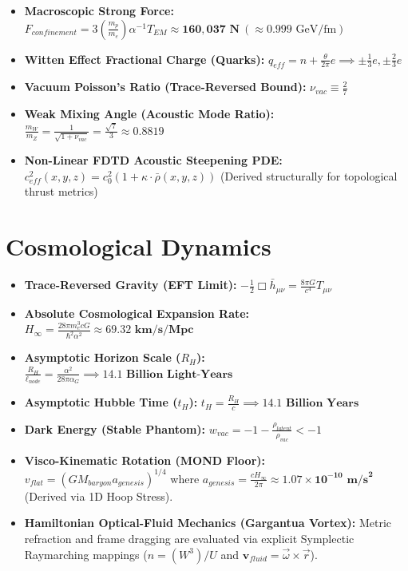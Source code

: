 \begin{itemize}
    \item \textbf{Macroscopic Strong Force:} $F_{confinement} = 3 \left(\frac{m_p}{m_e}\right) \alpha^{-1} T_{EM} \approx \mathbf{160{,}037\text{ N}} \ (\approx 0.999\text{ GeV/fm})$
    \item \textbf{Witten Effect Fractional Charge (Quarks):} $q_{eff} = n + \frac{\theta}{2\pi}e \implies \pm \frac{1}{3}e, \pm \frac{2}{3}e$
    \item \textbf{Vacuum Poisson's Ratio (Trace-Reversed Bound):} $\nu_{vac} \equiv \frac{2}{7}$
    \item \textbf{Weak Mixing Angle (Acoustic Mode Ratio):} $\frac{m_W}{m_Z} = \frac{1}{\sqrt{1+\nu_{vac}}} = \frac{\sqrt{7}}{3} \approx \mathbf{0.8819}$
    \item \textbf{Non-Linear FDTD Acoustic Steepening PDE:} $c_{eff}^2(x, y, z) = c_0^2 \left(1 + \kappa \cdot \bar{\rho}(x, y, z) \right)$ (Derived structurally for topological thrust metrics)
\end{itemize}

\section{Cosmological Dynamics}
\begin{itemize}
    \item \textbf{Trace-Reversed Gravity (EFT Limit):} $-\frac{1}{2} \Box \bar{h}_{\mu\nu} = \frac{8\pi G}{c^4} T_{\mu\nu}$
    \item \textbf{Absolute Cosmological Expansion Rate:} $H_\infty = \frac{28\pi m_e^3 c G}{\hbar^2 \alpha^2} \approx \mathbf{69.32 \text{ km/s/Mpc}}$
    \item \textbf{Asymptotic Horizon Scale ($R_H$):} $\frac{R_H}{\ell_{node}} = \frac{\alpha^2}{28\pi\alpha_G} \implies \mathbf{14.1 \text{ Billion Light-Years}}$
    \item \textbf{Asymptotic Hubble Time ($t_H$):} $t_H = \frac{R_H}{c} \implies \mathbf{14.1 \text{ Billion Years}}$
    \item \textbf{Dark Energy (Stable Phantom):} $w_{vac} = -1 - \frac{\rho_{latent}}{\rho_{vac}} < -1$
    \item \textbf{Visco-Kinematic Rotation (MOND Floor):} $v_{flat} = (GM_{baryon} a_{genesis})^{1/4}$ where $a_{genesis} = \frac{c H_\infty}{2\pi} \approx \mathbf{1.07 \times 10^{-10} \text{ m/s}^2}$ (Derived via 1D Hoop Stress).
    \item \textbf{Hamiltonian Optical-Fluid Mechanics (Gargantua Vortex):} Metric refraction and frame dragging are evaluated via explicit Symplectic Raymarching mappings ($n = (W^3) / U$ and $\mathbf{v}_{fluid} = \vec{\omega} \times \vec{r}$). 
\end{itemize}

